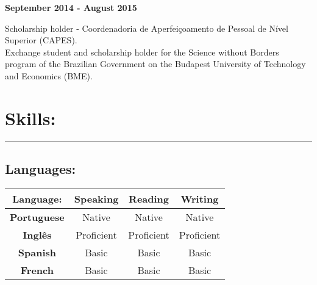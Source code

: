 \documentclass[11pt]{article}
\begin{document}
\textbf{September 2014 - August 2015}
\begin{addmargin}{0.5cm}
Scholarship holder - Coordenadoria de Aperfeiçoamento de Pessoal de Nível Superior (CAPES). \\
Exchange student and scholarship holder for the Science without Borders program of the Brazilian
Government on the Budapest University of Technology and Economics (BME). \\
\end{addmargin}

\section{Skills:}
\hrule \vspace{0.1cm}

\subsection{Languages:}
\begin{center}
\begin{tabular}{c | c | c | c}
\hline
\textbf{Language:} & Speaking  & Reading & Writing \\
\hline
\hline
\textbf{Portuguese} &  Native & Native & Native  \\
\hline
\textbf{Inglês} &  Proficient & Proficient & Proficient  \\
\hline
\textbf{Spanish} & Basic & Basic & Basic \\
\hline
\textbf{French} & Basic & Basic & Basic \\
\hline
\end{tabular}
\end{center}
\end{document}
